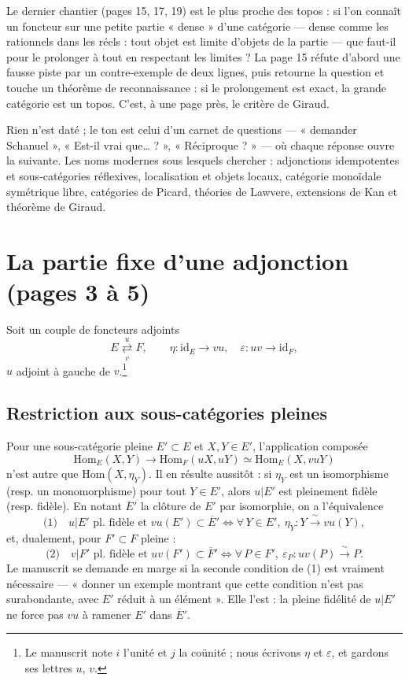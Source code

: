 \documentclass[11pt,a4paper]{article}
\begin{document}
\begin{resume}
Le dernier chantier (pages 15, 17, 19) est le plus proche des topos :
si l'on connaît un foncteur sur une petite partie « dense » d'une catégorie
— dense comme les rationnels dans les réels : tout objet est limite
d'objets de la partie — que faut-il pour le prolonger à tout en respectant
les limites ? La page 15 réfute d'abord une fausse piste par un
contre-exemple de deux lignes, puis retourne la question et touche un
théorème de reconnaissance : si le prolongement est exact, la grande
catégorie est un topos. C'est, à une page près, le critère de Giraud.

Rien n'est daté ; le ton est celui d'un carnet de questions — « demander
Schanuel », « Est-il vrai que… ? », « Réciproque ? » — où chaque réponse
ouvre la suivante. Les noms modernes sous lesquels chercher : adjonctions
idempotentes et sous-catégories réflexives, localisation et objets locaux,
catégorie monoïdale symétrique libre, catégories de Picard, théories de
Lawvere, extensions de Kan et théorème de Giraud.

\end{resume}

\section*{La partie fixe d'une adjonction (pages 3 à 5)}

Soit un couple de foncteurs adjoints
\[
E \underset{v}{\overset{u}{\rightleftarrows}} F,
\qquad \eta : \mathrm{id}_E \to vu, \quad \varepsilon : uv \to \mathrm{id}_F,
\]
$u$ adjoint à gauche de $v$.\footnote{Le manuscrit note $i$ l'unité et $j$
la coünité ; nous écrivons $\eta$ et $\varepsilon$, et gardons ses lettres
$u$, $v$.}

\subsection*{Restriction aux sous-catégories pleines}

Pour une sous-catégorie pleine $E' \subset E$ et $X, Y \in E'$,
l'application composée
\[
\mathrm{Hom}_E(X, Y) \longrightarrow \mathrm{Hom}_F(uX, uY)
\simeq \mathrm{Hom}_E(X, vuY)
\]
n'est autre que $\mathrm{Hom}(X, \eta_Y)$. Il en résulte aussitôt : si
$\eta_Y$ est un isomorphisme (resp. un monomorphisme) pour tout
$Y \in E'$, alors $u|E'$ est pleinement fidèle (resp. fidèle). En notant
$\overline{E}'$ la clôture de $E'$ par isomorphie, on a l'équivalence
\[
\text{(1)} \quad u|E' \text{ pl. fidèle et } vu(E') \subset \overline{E}'
\iff \forall\, Y \in E',\ \eta_Y : Y \xrightarrow{\ \sim\ } vu(Y),
\]
et, dualement, pour $F' \subset F$ pleine :
\[
\text{(2)} \quad v|F' \text{ pl. fidèle et } uv(F') \subset \overline{F}'
\iff \forall\, P \in F',\ \varepsilon_P : uv(P) \xrightarrow{\ \sim\ } P.
\]
Le manuscrit se demande en marge si la seconde condition de (1) est
vraiment nécessaire — « donner un exemple montrant que cette condition
n'est pas surabondante, avec $E'$ réduit à un élément ». Elle l'est : la
pleine fidélité de $u|E'$ ne force pas $vu$ à ramener $E'$ dans
$\overline{E}'$.
\end{document}
